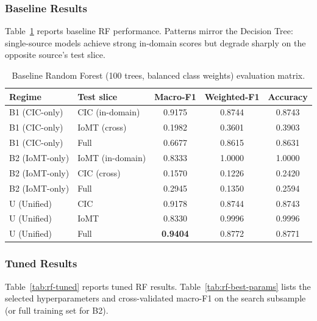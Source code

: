 \subsubsection{Baseline Results}

Table~\ref{tab:rf-baseline} reports baseline RF performance. Patterns mirror the Decision Tree: single-source models achieve strong in-domain scores but degrade sharply on the opposite source's test slice.

\begin{table}[H]
\centering
\caption{Baseline Random Forest (100 trees, balanced class weights) evaluation matrix.}
\label{tab:rf-baseline}
\small
\begin{tabular}{@{}l l c c c@{}}
\toprule
\textbf{Regime} & \textbf{Test slice} & \textbf{Macro-F1} & \textbf{Weighted-F1} & \textbf{Accuracy} \\
\midrule
B1 (CIC-only) & CIC (in-domain)  & 0.9175 & 0.8744 & 0.8743 \\
B1 (CIC-only) & IoMT (cross)     & 0.1982 & 0.3601 & 0.3903 \\
B1 (CIC-only) & Full             & 0.6677 & 0.8615 & 0.8631 \\
\midrule
B2 (IoMT-only) & IoMT (in-domain) & 0.8333 & 1.0000 & 1.0000 \\
B2 (IoMT-only) & CIC (cross)      & 0.1570 & 0.1226 & 0.2420 \\
B2 (IoMT-only) & Full             & 0.2945 & 0.1350 & 0.2594 \\
\midrule
U (Unified)    & CIC              & 0.9178 & 0.8744 & 0.8743 \\
U (Unified)    & IoMT             & 0.8330 & 0.9996 & 0.9996 \\
U (Unified)    & Full             & \textbf{0.9404} & 0.8772 & 0.8771 \\
\bottomrule
\end{tabular}
\end{table}

\subsubsection{Tuned Results}

Table~\ref{tab:rf-tuned} reports tuned RF results. Table~\ref{tab:rf-best-params} lists the selected hyperparameters and cross-validated macro-F1 on the search subsample (or full training set for B2).

